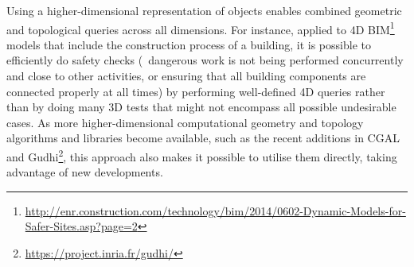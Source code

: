 Using a higher-dimensional representation of objects enables combined geometric and topological queries across all dimensions.
For instance, applied to 4D BIM\footnote{\url{http://enr.construction.com/technology/bim/2014/0602-Dynamic-Models-for-Safer-Sites.asp?page=2}} models that include the construction process of a building, it is possible to efficiently do safety checks (\eg\ dangerous work is not being performed concurrently and close to other activities, or ensuring that all building components are connected properly at all times) by performing well-defined 4D queries rather than by doing many 3D tests that might not encompass all possible undesirable cases.
As more higher-dimensional computational geometry and topology algorithms and libraries become available, such as the recent additions in CGAL and Gudhi\footnote{\url{https://project.inria.fr/gudhi/}}, this approach also makes it possible to utilise them directly, taking advantage of new developments.
